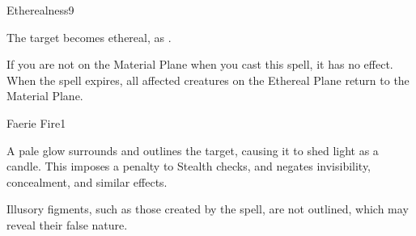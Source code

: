\begin{spellsection}{Etherealness}{9}
\begin{spellheader}
\end{spellheader}
\begin{spellcontent}
    \begin{spelltargetinginfo}
    \end{spelltargetinginfo}
    \begin{spelleffects}
        \spelleffect The target becomes ethereal, as .
    \end{spelleffects}
\end{spellcontent}
\begin{spellfooter}
    \spellnotes If you are not on the Material Plane when you cast this spell, it has no effect. When the spell expires, all affected creatures on the Ethereal Plane return to the Material Plane.
\end{spellfooter}

\begin{comment}
\subsubsection{F}
\end{comment}
\end{spellsection}

\begin{spellsection}{Faerie Fire}{1}
\begin{spellheader}
\end{spellheader}
\begin{spellcontent}
    \begin{spelltargetinginfo}
    \end{spelltargetinginfo}
    \begin{spelleffects}
        \spelleffect A pale glow surrounds and outlines the target, causing it to shed light as a candle. This imposes a  penalty to Stealth checks, and negates invisibility, concealment, and similar effects. 
        \spelldur \durshort \dismissable
    \end{spelleffects}
\end{spellcontent}
\begin{spellfooter}
    \spellnotes Illusory figments, such as those created by the  spell, are not outlined, which may reveal their false nature.
\end{spellfooter}
\end{spellsection}

